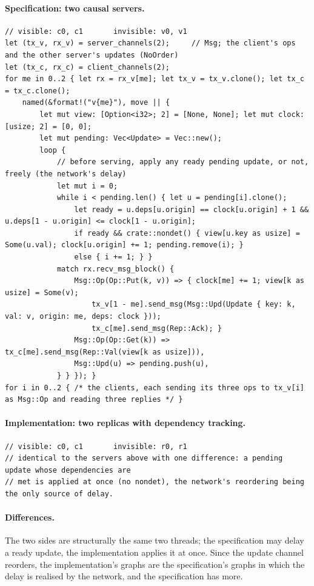 \documentclass[11pt,a4paper]{article}
\begin{document}
\paragraph{Specification: two causal servers.}
\begin{lstlisting}
// visible: c0, c1       invisible: v0, v1
let (tx_v, rx_v) = server_channels(2);     // Msg; the client's ops and the other server's updates (NoOrder)
let (tx_c, rx_c) = client_channels(2);
for me in 0..2 { let rx = rx_v[me]; let tx_v = tx_v.clone(); let tx_c = tx_c.clone();
    named(&format!("v{me}"), move || {
        let mut view: [Option<i32>; 2] = [None, None]; let mut clock: [usize; 2] = [0, 0];
        let mut pending: Vec<Update> = Vec::new();
        loop {
            // before serving, apply any ready pending update, or not, freely (the network's delay)
            let mut i = 0;
            while i < pending.len() { let u = pending[i].clone();
                let ready = u.deps[u.origin] == clock[u.origin] + 1 && u.deps[1 - u.origin] <= clock[1 - u.origin];
                if ready && crate::nondet() { view[u.key as usize] = Some(u.val); clock[u.origin] += 1; pending.remove(i); }
                else { i += 1; } }
            match rx.recv_msg_block() {
                Msg::Op(Op::Put(k, v)) => { clock[me] += 1; view[k as usize] = Some(v);
                    tx_v[1 - me].send_msg(Msg::Upd(Update { key: k, val: v, origin: me, deps: clock }));
                    tx_c[me].send_msg(Rep::Ack); }
                Msg::Op(Op::Get(k)) => tx_c[me].send_msg(Rep::Val(view[k as usize])),
                Msg::Upd(u) => pending.push(u),
            } } }); }
for i in 0..2 { /* the clients, each sending its three ops to tx_v[i] as Msg::Op and reading three replies */ }
\end{lstlisting}

\paragraph{Implementation: two replicas with dependency tracking.}
\begin{lstlisting}
// visible: c0, c1       invisible: r0, r1
// identical to the servers above with one difference: a pending update whose dependencies are
// met is applied at once (no nondet), the network's reordering being the only source of delay.
\end{lstlisting}

\paragraph{Differences.} The two sides are structurally the same two threads; the
specification may delay a ready update, the implementation applies it at once. Since the
update channel reorders, the implementation's graphs are the specification's graphs in which
the delay is realised by the network, and the specification has more.
\end{document}
